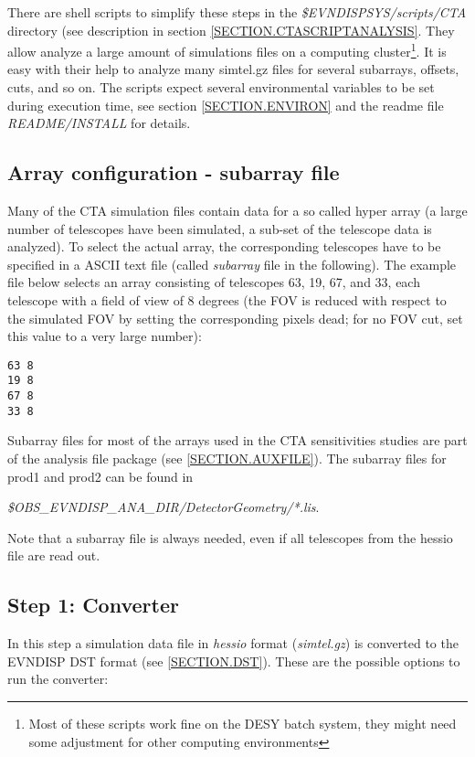 \documentclass[titlepage,a4paper,twoside,11pt]{report}
\begin{document}
There are shell scripts to simplify these steps in the {\it \$EVNDISPSYS/scripts/CTA} directory (see description in section \ref{SECTION.CTASCRIPTANALYSIS}.
They allow analyze a large amount of simulations files on a computing cluster\footnote{Most of these scripts work fine on the DESY batch system, they might need some adjustment for other computing environments}.
It is easy with their help to analyze many simtel.gz files for several subarrays, offsets, cuts, and so on. 
The scripts expect several environmental variables to be set during execution time, see section \ref{SECTION.ENVIRON} and the readme file {\it README/INSTALL} for details.

\subsection{Array configuration - subarray file}

Many of the CTA simulation files contain data for a so called hyper array 
(a large number of telescopes have been simulated, a sub-set of the telescope data is analyzed).
To select the actual array, the corresponding telescopes have to be specified in a ASCII text file (called {\it subarray} file in the following).
The  example file below selects an array consisting of telescopes 63, 19, 67, and 33, each telescope
with a field of view of 8 degrees (the FOV is reduced with respect to the simulated FOV by setting the corresponding pixels dead; for no FOV cut, set this value to a very large number):

\begin{lstlisting}
63 8
19 8
67 8
33 8
\end{lstlisting}

Subarray files for most of the arrays used in the CTA sensitivities studies are part of the analysis file package 
(see \ref{SECTION.AUXFILE}). The subarray files for prod1 and prod2 can be found in 

{\it \$OBS\_EVNDISP\_ANA\_DIR/DetectorGeometry/*.lis}.

Note that a subarray file is always needed, even if all telescopes from the hessio file are read out.

\subsection{Step 1: Converter}

In this step a simulation data file in {\it hessio} format ({\it simtel.gz}) is converted to the EVNDISP DST format 
(see \ref{SECTION.DST}). These are the possible options to run the converter:
\end{document}
